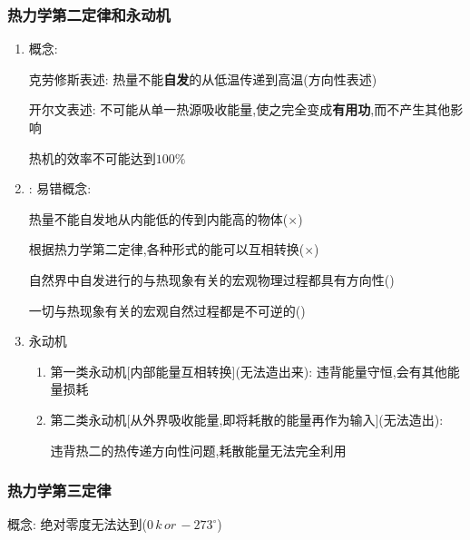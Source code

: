 \documentclass{article}
\begin{document}
\subsubsection{热力学第二定律和永动机}
\begin{enumerate}[label = \arabic*]
    \item 概念:

          \hspace{2.7em}克劳修斯表述: 热量不能\textbf{自发}的从低温传递到高温(方向性表述)

          \hspace{2.7em}开尔文表述: 不可能从单一热源吸收能量,使之完全变成\textbf{有用功},而不产生其他影响

          \hspace{8.4em}热机的效率不可能达到$100 \%$
          \item: 易错概念:

          \hspace{4.7em}热量不能自发地从内能低的传到内能高的物体($\times$)

          \hspace{4.7em}根据热力学第二定律,各种形式的能可以互相转换($\times$)

          \hspace{4.7em}自然界中自发进行的与热现象有关的宏观物理过程都具有方向性(\checkmark)

          \hspace{4.7em}一切与热现象有关的宏观自然过程都是不可逆的(\checkmark)

    \item 永动机

          \begin{enumerate}[label = (\arabic*)]
              \item 第一类永动机[内部能量互相转换](无法造出来): 违背能量守恒,会有其他能量损耗
              \item 第二类永动机[从外界吸收能量,即将耗散的能量再作为输入](无法造出):

                    \hspace{6.2em}违背热二的热传递方向性问题,耗散能量无法完全利用
          \end{enumerate}
\end{enumerate}

\subsubsection{热力学第三定律}
概念: 绝对零度无法达到($0 \, k \, or \, -273^{\circ}$)
\end{document}
